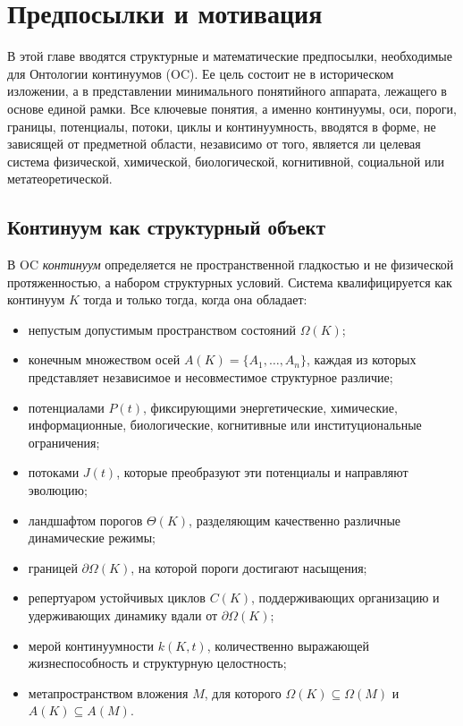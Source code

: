 
\section{Предпосылки и мотивация}
\label{sec:background}

В этой главе вводятся структурные и математические предпосылки, необходимые для Онтологии континуумов (OC).
Ее цель состоит не в историческом изложении, а в представлении минимального понятийного аппарата, лежащего в основе единой рамки.
Все ключевые понятия, а именно континуумы, оси, пороги, границы, потенциалы, потоки, циклы и континуумность, вводятся в форме, не зависящей от предметной области, независимо от того, является ли целевая система физической, химической, биологической, когнитивной, социальной или метатеоретической.

\subsection{Континуум как структурный объект}

В OC \emph{континуум} определяется не пространственной гладкостью и не физической протяженностью, а набором структурных условий.
Система квалифицируется как континуум \(K\) тогда и только тогда, когда она обладает:

\begin{itemize}
    \item непустым допустимым пространством состояний \(\Omega(K)\);
    \item конечным множеством осей \(A(K)=\{A_1,\dots,A_n\}\), каждая из которых представляет независимое и несовместимое структурное различие;
    \item потенциалами \(P(t)\), фиксирующими энергетические, химические, информационные, биологические, когнитивные или институциональные ограничения;
    \item потоками \(J(t)\), которые преобразуют эти потенциалы и направляют эволюцию;
    \item ландшафтом порогов \(\Theta(K)\), разделяющим качественно различные динамические режимы;
    \item границей \(\partial\Omega(K)\), на которой пороги достигают насыщения;
    \item репертуаром устойчивых циклов \(C(K)\), поддерживающих организацию и удерживающих динамику вдали от \(\partial\Omega(K)\);
    \item мерой континуумности \(k(K,t)\), количественно выражающей жизнеспособность и структурную целостность;
    \item метапространством вложения \(M\), для которого \(\Omega(K)\subseteq\Omega(M)\) и \(A(K)\subseteq A(M)\).
\end{itemize}

